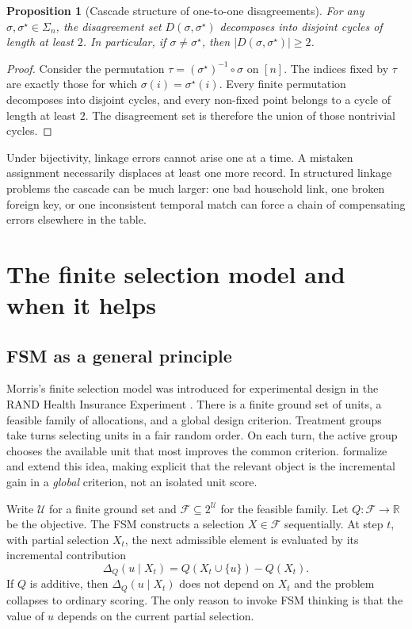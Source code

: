 \documentclass[11pt]{article}
\newtheorem{proposition}{Proposition}[section]
\theoremstyle{remark}
\begin{document}
\begin{proposition}[Cascade structure of one-to-one disagreements]
\label{prop:cycles}
For any $\sigma,\sigma^\star\in\Sigma_n$, the disagreement set $D(\sigma,\sigma^\star)$ decomposes into disjoint cycles of length at least $2$. In particular, if $\sigma\neq \sigma^\star$, then $|D(\sigma,\sigma^\star)|\ge 2$.
\end{proposition}

\begin{proof}
Consider the permutation $\tau=(\sigma^\star)^{-1}\circ\sigma$ on $[n]$. The indices fixed by $\tau$ are exactly those for which $\sigma(i)=\sigma^\star(i)$. Every finite permutation decomposes into disjoint cycles, and every non-fixed point belongs to a cycle of length at least $2$. The disagreement set is therefore the union of those nontrivial cycles.
\end{proof}

Under bijectivity, linkage errors cannot arise one at a time. A mistaken assignment necessarily displaces at least one more record. In structured linkage problems the cascade can be much larger: one bad household link, one broken foreign key, or one inconsistent temporal match can force a chain of compensating errors elsewhere in the table.

\section{The finite selection model and when it helps}
\label{sec:fsm}

\subsection{FSM as a general principle}

Morris's finite selection model was introduced for experimental design in the RAND Health Insurance Experiment \citep{Morris1979,Newhouse1993}. There is a finite ground set of units, a feasible family of allocations, and a global design criterion. Treatment groups take turns selecting units in a fair random order. On each turn, the active group chooses the available unit that most improves the common criterion. \citet{Chattopadhyay2026} formalize and extend this idea, making explicit that the relevant object is the incremental gain in a \emph{global} criterion, not an isolated unit score.

Write $\mathcal{U}$ for a finite ground set and $\mathcal{F}\subseteq 2^{\mathcal{U}}$ for the feasible family. Let $Q:\mathcal{F}\to\mathbb{R}$ be the objective. The FSM constructs a selection $X\in\mathcal{F}$ sequentially. At step $t$, with partial selection $X_t$, the next admissible element is evaluated by its incremental contribution
\[
\Delta_Q(u\mid X_t)=Q(X_t\cup\{u\})-Q(X_t).
\]
If $Q$ is additive, then $\Delta_Q(u\mid X_t)$ does not depend on $X_t$ and the problem collapses to ordinary scoring. The only reason to invoke FSM thinking is that the value of $u$ depends on the current partial selection.
\end{document}
